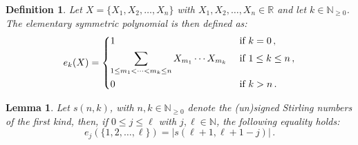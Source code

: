 \documentclass{article}
\newtheorem{lemma}[theorem]{Lemma}
\newtheorem{definition}[theorem]{Definition}
\begin{document}
\begin{definition}
Let $X = \{ X_1, X_2, \dots, X_n \}$ with $X_1, X_2, \dots, X_n \in \mathbb R$ and let $k \in \mathbb N_{\geq0}$.
The elementary symmetric polynomial is then defined as:
\begin{equation}
    e_k(X) = \begin{dcases}
        1 & \textrm{ if } k = 0\,, \\
        \sum_{1 \leq m_1 < \cdots < m_k \leq n} X_{m_1} \cdots X_{m_k} & \textrm{ if } 1 \leq k \leq n\,, \\
        0 & \textrm{ if } k > n\,.
    \end{dcases} \nonumber
\end{equation}
\end{definition}


\begin{lemma}
\label{lemma:complete}
Let $s(n, k)$, with $n,k \in \mathbb N_{\geq 0}$ denote the (un)signed Stirling numbers of the first kind, then, if $0\leq j \leq \ell$ with $j,\ell \in \mathbb N$, the following equality holds:
\begin{equation}
    e_j(\{ 1, 2, \dots, \ell \}) = |s(\ell+1, \ell+1-j)| \,. \label{eq:ind_step}
\end{equation}
\end{lemma}
\end{document}
